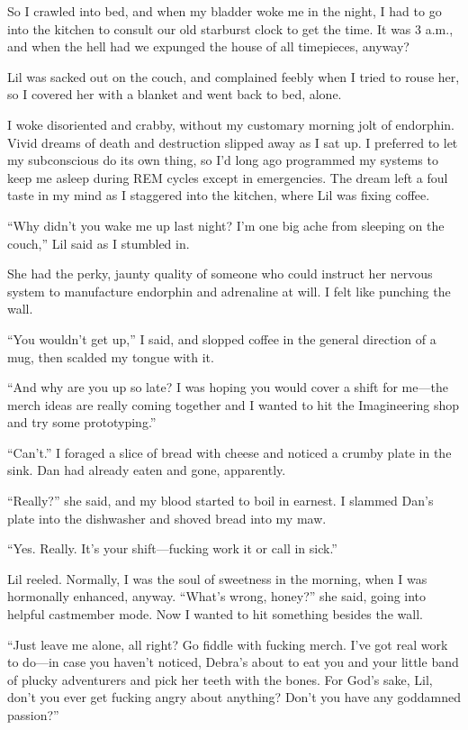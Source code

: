 So I crawled into bed, and when my bladder woke me in the night, I
had to go into the kitchen to consult our old starburst clock to
get the time. It was 3 a.m., and when the hell had we expunged the
house of all timepieces, anyway?

Lil was sacked out on the couch, and complained feebly when I tried
to rouse her, so I covered her with a blanket and went back to bed,
alone.

I woke disoriented and crabby, without my customary morning jolt of
endorphin. Vivid dreams of death and destruction slipped away as I
sat up. I preferred to let my subconscious do its own thing, so I'd
long ago programmed my systems to keep me asleep during REM cycles
except in emergencies. The dream left a foul taste in my mind as I
staggered into the kitchen, where Lil was fixing coffee.

“Why didn't you wake me up last night? I'm one big ache from
sleeping on the couch,” Lil said as I stumbled in.

She had the perky, jaunty quality of someone who could instruct her
nervous system to manufacture endorphin and adrenaline at will. I
felt like punching the wall.

“You wouldn't get up,” I said, and slopped coffee in the general
direction of a mug, then scalded my tongue with it.

“And why are you up so late? I was hoping you would cover a shift
for me—the merch ideas are really coming together and I wanted to
hit the Imagineering shop and try some prototyping.”

“Can't.” I foraged a slice of bread with cheese and noticed a
crumby plate in the sink. Dan had already eaten and gone,
apparently.

“Really?” she said, and my blood started to boil in earnest. I
slammed Dan's plate into the dishwasher and shoved bread into my
maw.

“Yes. Really. It's your shift—fucking work it or call in sick.”

Lil reeled. Normally, I was the soul of sweetness in the morning,
when I was hormonally enhanced, anyway. “What's wrong, honey?” she
said, going into helpful castmember mode. Now I wanted to hit
something besides the wall.

“Just leave me alone, all right? Go fiddle with fucking merch. I've
got real work to do—in case you haven't noticed, Debra's about to
eat you and your little band of plucky adventurers and pick her
teeth with the bones. For God's sake, Lil, don't you ever get
fucking angry about anything? Don't you have any goddamned
passion?”

